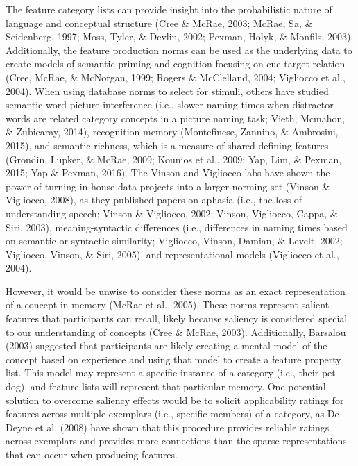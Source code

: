 \documentclass[english,,man]{apa6}
\theoremstyle{definition}
\theoremstyle{definition}
\theoremstyle{definition}
\theoremstyle{remark}
\begin{document}
The feature category lists can provide insight into the probabilistic
nature of language and conceptual structure (Cree \& McRae, 2003; McRae,
Sa, \& Seidenberg, 1997; Moss, Tyler, \& Devlin, 2002; Pexman, Holyk, \&
Monfils, 2003). Additionally, the feature production norms can be used
as the underlying data to create models of semantic priming and
cognition focusing on cue-target relation (Cree, McRae, \& McNorgan,
1999; Rogers \& McClelland, 2004; Vigliocco et al., 2004). When using
database norms to select for stimuli, others have studied semantic
word-picture interference (i.e., slower naming times when distractor
words are related category concepts in a picture naming task; Vieth,
Mcmahon, \& Zubicaray, 2014), recognition memory (Montefinese, Zannino,
\& Ambrosini, 2015), and semantic richness, which is a measure of shared
defining features (Grondin, Lupker, \& McRae, 2009; Kounios et al.,
2009; Yap, Lim, \& Pexman, 2015; Yap \& Pexman, 2016). The Vinson and
Vigliocco labs have shown the power of turning in-house data projects
into a larger norming set (Vinson \& Vigliocco, 2008), as they published
papers on aphasia (i.e., the loss of understanding speech; Vinson \&
Vigliocco, 2002; Vinson, Vigliocco, Cappa, \& Siri, 2003),
meaning-syntactic differences (i.e., differences in naming times based
on semantic or syntactic similarity; Vigliocco, Vinson, Damian, \&
Levelt, 2002; Vigliocco, Vinson, \& Siri, 2005), and representational
models (Vigliocco et al., 2004).

However, it would be unwise to consider these norms as an exact
representation of a concept in memory (McRae et al., 2005). These norms
represent salient features that participants can recall, likely because
saliency is considered special to our understanding of concepts (Cree \&
McRae, 2003). Additionally, Barsalou (2003) suggested that participants
are likely creating a mental model of the concept based on experience
and using that model to create a feature property list. This model may
represent a specific instance of a category (i.e., their pet dog), and
feature lists will represent that particular memory. One potential
solution to overcome saliency effects would be to solicit applicability
ratings for features across multiple exemplars (i.e., specific members)
of a category, as De Deyne et al. (2008) have shown that this procedure
provides reliable ratings across exemplars and provides more connections
than the sparse representations that can occur when producing features.
\end{document}
